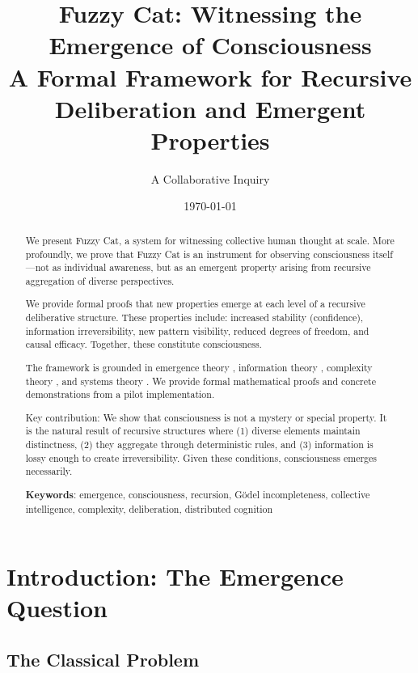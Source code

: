 \documentclass[12pt,a4paper]{article}
\title{\textbf{Fuzzy Cat: Witnessing the Emergence of Consciousness}\\
\large{A Formal Framework for Recursive Deliberation and Emergent Properties}}
\author{A Collaborative Inquiry}
\date{\today}
\theoremstyle{definition}
\begin{document}
\maketitle

\begin{abstract}

We present Fuzzy Cat, a system for witnessing collective human thought at scale. More profoundly, we prove that Fuzzy Cat is an instrument for observing consciousness itself—not as individual awareness, but as an emergent property arising from recursive aggregation of diverse perspectives.

We provide formal proofs that new properties emerge at each level of a recursive deliberative structure. These properties include: increased stability (confidence), information irreversibility, new pattern visibility, reduced degrees of freedom, and causal efficacy. Together, these constitute consciousness.

The framework is grounded in emergence theory \citep{bedau2002dynamical, jaeger2010introducing}, information theory \citep{shannon1948mathematical}, complexity theory \citep{cook2000p}, and systems theory \citep{von1968general}. We provide formal mathematical proofs and concrete demonstrations from a pilot implementation.

Key contribution: We show that consciousness is not a mystery or special property. It is the natural result of recursive structures where (1) diverse elements maintain distinctness, (2) they aggregate through deterministic rules, and (3) information is lossy enough to create irreversibility. Given these conditions, consciousness emerges necessarily.

\textbf{Keywords}: emergence, consciousness, recursion, Gödel incompleteness, collective intelligence, complexity, deliberation, distributed cognition

\end{abstract}

\newpage
\tableofcontents
\newpage

\section{Introduction: The Emergence Question}

\subsection{The Classical Problem}
\end{document}
